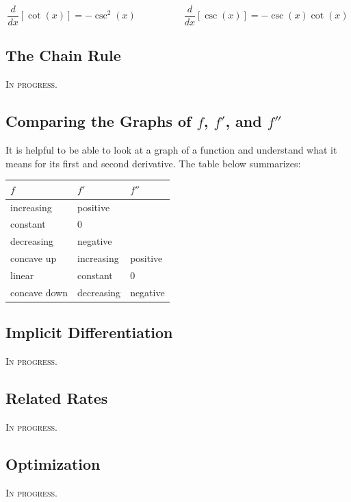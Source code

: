 \documentclass{article}
\theoremstyle{definition}
\theoremstyle{definition}
\begin{document}
$$\frac{d}{dx}[\cot(x)] = -\csc^2(x)
\quad\quad\quad\quad\quad
\frac{d}{dx}[\csc(x)] = -\csc(x)\cot(x)$$






\subsection{The Chain Rule}
\textsc{In progress.}


\subsection{Comparing the Graphs of $f$, $f'$, and $f''$}
It is helpful to be able to look at a graph of a function and understand what it means for its first and second derivative. The table below summarizes:

\begin{center}
\def\arraystretch{1.3}
\begin{tabular}{@{}lll@{}}
\toprule[0.4mm]
$f$ & $f'$ & $f''$ \\
\midrule
increasing & positive & \\
constant & 0 & \\
decreasing & negative & \\
\midrule
concave up & increasing & positive \\
linear & constant & 0 \\
concave down & decreasing & negative \\
\bottomrule[0.4mm]


\end{tabular}
\end{center}






































\subsection{Implicit Differentiation}
\textsc{In progress.}


\subsection{Related Rates}
\textsc{In progress.}


\subsection{Optimization}
\textsc{In progress.}
\end{document}
